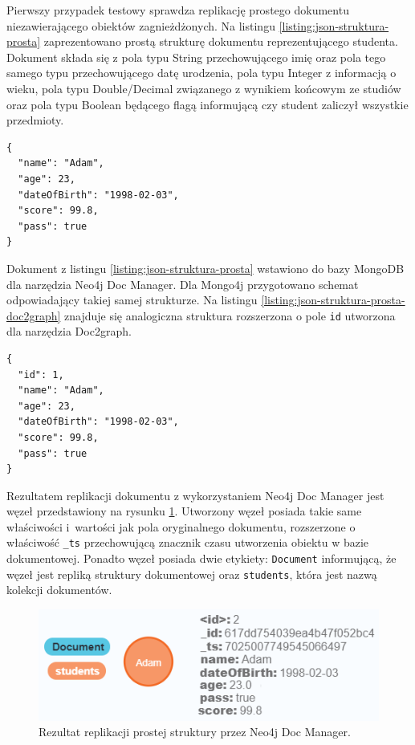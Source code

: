 \documentclass[a4paper,twoside,12pt]{book}
\begin{document}
Pierwszy przypadek testowy sprawdza replikację prostego dokumentu niezawierającego obiektów zagnieżdżonych. Na listingu \ref{listing:json-struktura-prosta} zaprezentowano prostą strukturę dokumentu reprezentującego studenta. Dokument składa się z pola typu String przechowującego imię oraz pola tego samego typu przechowującego datę urodzenia, pola typu Integer z informacją o wieku, pola typu Double/Decimal związanego z wynikiem końcowym ze studiów oraz pola typu Boolean będącego flagą informującą czy student zaliczył wszystkie przedmioty.

\begin{lstlisting}[style=JSON, caption={Struktura prostego dokumentu.}, label={listing:json-struktura-prosta}, captionpos=b] 
{
  "name": "Adam",
  "age": 23,
  "dateOfBirth": "1998-02-03",
  "score": 99.8,
  "pass": true
}
\end{lstlisting}

Dokument z listingu \ref{listing:json-struktura-prosta} wstawiono do bazy MongoDB dla narzędzia Neo4j Doc Manager. Dla Mongo4j przygotowano schemat odpowiadający takiej samej strukturze. Na listingu \ref{listing:json-struktura-prosta-doc2graph} znajduje się analogiczna struktura rozszerzona o pole \texttt{id} utworzona dla narzędzia Doc2graph.



\begin{lstlisting}[style=JSON, caption={Struktura prostego dokumentu dla Doc2graph.}, label={listing:json-struktura-prosta-doc2graph}, captionpos=b]
{
  "id": 1,
  "name": "Adam",
  "age": 23,
  "dateOfBirth": "1998-02-03",
  "score": 99.8,
  "pass": true
}
\end{lstlisting}

Rezultatem replikacji dokumentu z wykorzystaniem Neo4j Doc Manager jest węzeł przedstawiony na rysunku \ref{fig:graf-struktura-prosta-neo4jdocmanager}. Utworzony węzeł posiada takie same właściwości i~wartości jak pola oryginalnego dokumentu, rozszerzone o właściwość \texttt{\_ts} przechowującą znacznik czasu utworzenia obiektu w bazie dokumentowej. Ponadto węzeł posiada dwie etykiety: \texttt{Document} informującą, że węzeł jest repliką struktury dokumentowej oraz \texttt{students}, która jest nazwą kolekcji dokumentów. 

\begin{figure}[!h]
\centering
\includegraphics[width=12cm]{images/struktura_prosta_neo4jdocmanager.png}
\caption{Rezultat replikacji prostej struktury przez Neo4j Doc Manager.}
\label{fig:graf-struktura-prosta-neo4jdocmanager}
\end{figure}
\end{document}

